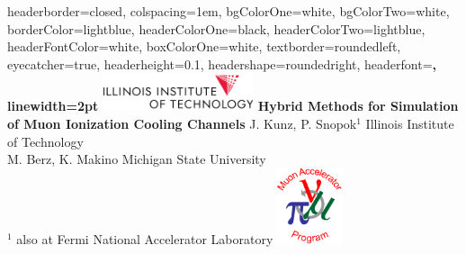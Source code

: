 \documentclass[portrait,a0paper,fontscale=0.285]{baposter} %
\begin{document}
\begin{poster}
{
headerborder=closed, %
colspacing=1em, %
bgColorOne=white, %
bgColorTwo=white, %
borderColor=lightblue, %
headerColorOne=black, %
headerColorTwo=lightblue, %
headerFontColor=white, %
boxColorOne=white, %
textborder=roundedleft, %
eyecatcher=true, %
headerheight=0.1\textheight, %
headershape=roundedright, %
headerfont=\Large\bf\textsc, %
linewidth=2pt %
}
%
{\includegraphics[height=3em]{Figures/IITlogo.png}} %
{\bf\huge{\hspace{-1.5in}Hybrid Methods for Simulation \\ \hspace{-1.5in}of Muon Ionization Cooling Channels}\vspace{0.1em}} %
{{ \large{\hspace{-1.5in}J. Kunz, P. Snopok$^1$ \hspace{12pt} Illinois Institute of Technology \\\hspace{-1.5in}M. Berz, K. Makino \hspace{12pt}Michigan State University \\\hspace{-1.5in}$^1$ also at Fermi National Accelerator Laboratory \vspace{-0.4em}}}}
{\includegraphics[height=6em]{Figures/MAPlogo.png}} %


\end{poster}
\end{document}
